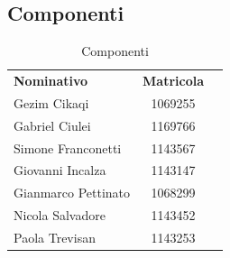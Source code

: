 \subsection{Componenti}
\begin{longtable}{|p{5cm}|c|c|}
	\arrayrulecolor{white}
	\caption{Componenti} \\
	\hline
	\rowcolor{header}
	\textbf{Nominativo} & \textbf{Matricola}
	\tabularnewline
	\endfirsthead
	\hline
	Gezim Cikaqi & 1069255 \\
	Gabriel Ciulei & 1169766 \\
	Simone Franconetti & 1143567\\
	Giovanni Incalza & 1143147 \\
	Gianmarco Pettinato & 1068299 \\
	Nicola Salvadore & 1143452 \\
	Paola Trevisan & 1143253\\
	\hline
\end{longtable}